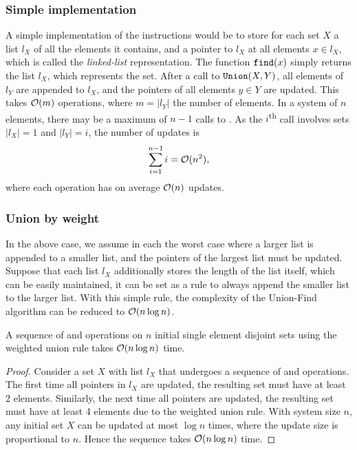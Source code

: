 \subsubsection{Simple implementation}
A simple implementation of the instructions would be to store for each set $X$ a list $l_X$ of all the elements it contains, and a pointer to $l_X$ at all elements $x\in l_X$, which is called the \emph{linked-list} representation. The function $\texttt{find}(x)$ simply returns the list $l_X$, which represents the set. After a call to $\texttt{Union}(X, Y)$, all elements of $l_Y$ are appended to $l_X$, and the pointers of all elements $y\in Y$ are updated. This takes $\mathcal{O}(m)$ operations, where $m=|l_Y|$ the number of elements. In a system of $n$ elements, there may be a maximum of $n-1$ calls to . As the $i$\textsuperscript{th} call involves sets $|l_X|=1$ and $|l_Y|=i$, the number of updates is 
\begin{equation}
  \sum_{i=1}^{n-1} i = \mathcal{O}(n^2),
\end{equation}
where each  operation has on average $\mathcal{O}(n)$ updates. 

\subsubsection{Union by weight}
In the above case, we assume in each  the worst case where a larger list is appended to a smaller list, and the pointers of the largest list must be updated. Suppose that each list $l_X$ additionally stores the length of the list itself, which can be easily maintained, it can be set as a rule to always append the smaller list to the larger list. With this simple rule, the complexity of the Union-Find algorithm can be reduced to $\mathcal{O}(n \log n)$. 

\begin{theorem}
  A sequence of  and  operations on $n$ initial single element disjoint sets using the weighted union rule takes $\mathcal{O}(n \log n)$ time. 
\end{theorem}
\begin{proof}
  Consider a set $X$ with list $l_X$ that undergoes a sequence of  and  operations. The first time all pointers in $l_X$ are updated, the resulting set must have at least 2 elements. Similarly, the next time all pointers are updated, the resulting set must have at least 4 elements due to the weighted union rule. With system size $n$, any initial set $X$ can be updated at most $\log n$ times, where the update size is proportional to $n$. Hence the sequence takes $\mathcal{O}(n \log n)$ time. 
\end{proof}

